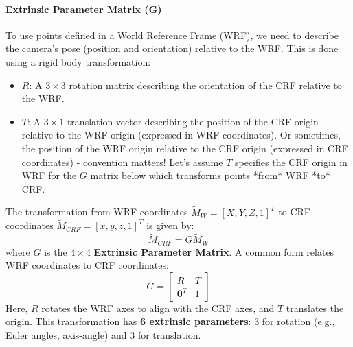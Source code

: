\paragraph{Extrinsic Parameter Matrix (G)}
To use points defined in a World Reference Frame (WRF), we need to describe the camera's pose (position and orientation) relative to the WRF. This is done using a rigid body transformation:
\begin{itemize}
    \item $R$: A $3 \times 3$ rotation matrix describing the orientation of the CRF relative to the WRF.
    \item $T$: A $3 \times 1$ translation vector describing the position of the CRF origin relative to the WRF origin (expressed in WRF coordinates). Or sometimes, the position of the WRF origin relative to the CRF origin (expressed in CRF coordinates) - convention matters! Let's assume $T$ specifies the CRF origin in WRF for the $G$ matrix below which transforms points *from* WRF *to* CRF.
\end{itemize}
The transformation from WRF coordinates $\tilde{M}_W = [X, Y, Z, 1]^T$ to CRF coordinates $\tilde{M}_{CRF} = [x, y, z, 1]^T$ is given by:
\[
\tilde{M}_{CRF} = G \tilde{M}_W
\]
where $G$ is the $4 \times 4$ \textbf{Extrinsic Parameter Matrix}. A common form relates WRF coordinates to CRF coordinates:
\[
G = \begin{bmatrix} R & T \\ \mathbf{0}^T & 1 \end{bmatrix}
\]
Here, $R$ rotates the WRF axes to align with the CRF axes, and $T$ translates the origin. This transformation has \textbf{6 extrinsic parameters}: 3 for rotation (e.g., Euler angles, axis-angle) and 3 for translation.


